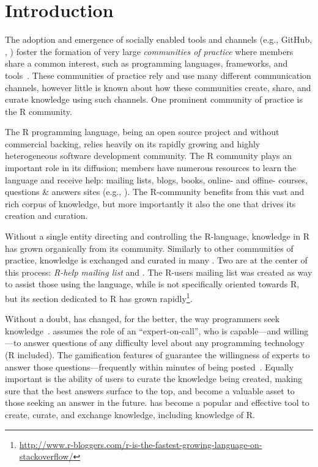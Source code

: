 \section{Introduction}
\label{cha:introduction}
The adoption and emergence of socially enabled tools and channels (e.g., GitHub, \SO, \ml) foster the formation of very large \textit{communities of practice} where members share a common interest, such as programming languages, frameworks, and tools~\cite{Storey2014}. These communities of practice rely and use many different communication channels, however little is known about how these communities create, share, and curate knowledge using such channels. One prominent community of practice is the R community.

The R programming language, being an open source project and without commercial backing, relies heavily on its rapidly growing and highly heterogeneous software development community. The R community plays an important role in its diffusion; members have numerous resources to learn the language and receive help: mailing lists, blogs, books, online- and offine- courses, questions \& answers sites (e.g., \SO). The R-community benefits from this vast and rich corpus of knowledge, but more importantly it also the one that drives its creation and curation.

Without a single entity directing and controlling the R-language, knowledge in R has grown organically from its community. Similarly to other communities of practice, knowledge is exchanged and curated in many \channels. Two \channels are at the center of this process: \textit{R-help mailing list} and \textit{\SO}. The R-users mailing list was created as way to assist those using the language, while \SO is not specifically oriented towards R, but its section dedicated to R has grown rapidly\footnote{\url{http://www.r-bloggers.com/r-is-the-fastest-growing-language-on-stackoverflow/}}.

Without a doubt, \SO has changed, for the better, the way programmers seek knowledge~\cn. \SO assumes the role of an ``expert-on-call'', who is capable---and willing---to answer questions of any difficulty level about any programming technology (R included). The gamification features of \SO guarantee the willingness of experts to answer those questions---frequently within minutes of being posted~\cn{}. Equally important is the ability of \SO users to curate the knowledge being created, making sure that the best answers surface to the top, and become a valuable asset to those seeking an answer in the future. \SO has become a popular and effective tool to create, curate, and exchange knowledge, including knowledge of R.

